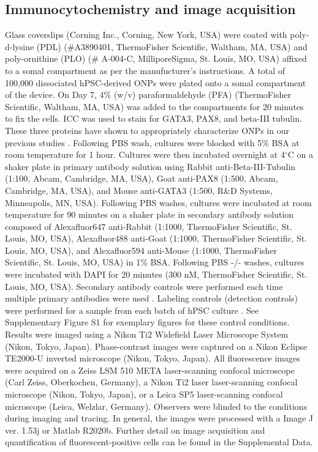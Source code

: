 \documentclass[review]{elsarticle}
\begin{document}
\subsection{Immunocytochemistry and image acquisition}
Glass coverslips (Corning Inc., Corning, New York, USA) were coated with poly-d-lysine (PDL) (\#A3890401, ThermoFisher Scientific, Waltham, MA, USA) and poly-ornithine (PLO) (\# A-004-C, MilliporeSigma, St. Louis, MO, USA) affixed to a somal compartment as per the manufucturer’s instructions. A total of 100,000 dissociated hPSC-derived ONPs were plated onto a somal compartment of the device. On Day 7, 4\% (w/v) paraformaldehyde (PFA) (ThermoFisher Scientific, Waltham, MA, USA) was added to the compartments for 20 minutes to fix the cells. ICC was used to stain for GATA3, PAX8, and beta-III tubulin. These three proteins have shown to appropriately characterize ONPs in our previous studies \cite{Heuer2021, Chang2020, Matsuoka2017}. Following PBS wash, cultures were blocked with 5\% BSA at room temperature for 1 hour. Cultures were then incubated overnight at 4$^\circ$C on a shaker plate in primary antibody solution using Rabbit anti-Beta-III-Tubulin (1:100, Abcam, Cambridge, MA, USA), Goat anti-PAX8 (1:500, Abcam, Cambridge, MA, USA), and Mouse anti-GATA3 (1:500, R\&D Systems, Minneapolis, MN, USA). Following PBS washes, cultures were incubated at room temperature for 90 minutes on a shaker plate in secondary antibody solution composed of Alexafluor647 anti-Rabbit (1:1000, ThermoFisher Scientific, St. Louis, MO, USA), Alexafluor488 anti-Goat (1:1000, ThermoFisher Scientific, St. Louis, MO, USA), and Alexafluor594 anti-Mouse (1:1000, ThermoFisher Scientific, St. Louis, MO, USA) in 1\% BSA. Following PBS -/- washes, cultures were incubated with DAPI for 20 minutes (300 nM, ThermoFisher Scientific, St. Louis, MO, USA). Secondary antibody controls were performed each time multiple primary antibodies were used \cite{Burry2011}. Labeling controls (detection controls) were performed for a sample from each batch of hPSC culture \cite{Burry2011}. See Supplementary Figure S1 for exemplary figures for these control conditions. Results were imaged using a Nikon Ti2 Widefield Laser Microscope System (Nikon, Tokyo, Japan). Phase-contrast images were captured on a Nikon Eclipse TE2000-U inverted microscope (Nikon, Tokyo, Japan). All fluorescence images were acquired on a Zeiss LSM 510 META laser-scanning confocal microscope (Carl Zeiss, Oberkochen, Germany), a Nikon Ti2 laser laser-scanning confocal microscope (Nikon, Tokyo, Japan), or a Leica SP5 laser-scanning confocal microscope (Leica, Welzlar, Germany). Observers were blinded to the conditions during imaging and tracing. In general, the images were processed with a Image J  ver. 1.53j or Matlab R2020b. Further detail on image acquisition and quantification of fluorescent-positive cells can be found in the Supplemental Data. 
\end{document}
